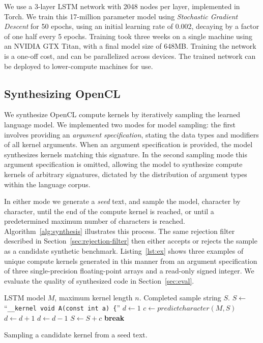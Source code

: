 We use a 3-layer LSTM network with 2048 nodes per layer, implemented in Torch. We train this 17-million parameter model using \textit{Stochastic Gradient Descent} for 50 epochs, using an initial learning rate of 0.002, decaying by a factor of one half every 5 epochs. Training took three weeks on a single machine using an NVIDIA GTX Titan, with a final model size of 648MB. Training the network is a one-off cost, and can be parallelized across devices. The trained network can be deployed to lower-compute machines for use.

\subsection{Synthesizing OpenCL}

We synthesize OpenCL compute kernels by iteratively sampling the learned language model. We implemented two modes for model sampling: the first involves providing an \emph{argument specification}, stating the data types and modifiers of all kernel arguments. When an argument specification is provided, the model synthesizes kernels matching this signature. In the second sampling mode this argument specification is omitted, allowing the model to synthesize compute kernels of arbitrary signatures, dictated by the distribution of argument types within the language corpus.

In either mode we generate a \emph{seed} text, and sample the model, character by character, until the end of the compute kernel is reached, or until a predetermined maximum number of characters is reached. Algorithm~\ref{alg:synthesis} illustrates this process. The same rejection filter described in Section~\ref{sec:rejection-filter} then either accepts or rejects the sample as a candidate synthetic benchmark. Listing~\ref{lst:ex} shows three examples of unique compute kernels generated in this manner from an argument specification of three single-precision floating-point arrays and a read-only signed integer. We evaluate the quality of synthesized code in Section~\ref{sec:eval}.

\begin{algorithm}[t]
\begin{algorithmic}[1]
\Require LSTM model $M$, maximum kernel length $n$.
\Ensure Completed sample string $S$.
\State $S \gets$``\texttt{\_\_kernel void A(const int a) \{}''
\State $d \gets 1$
  \State $c \gets predictcharacter(M, S)$
    \State $d \gets d+1$
    \State $d \gets d-1$
  \EndIf
  \State $S \gets S + c$
    \State \textbf{break}
  \EndIf

\EndFor
\end{algorithmic}
\caption{Sampling a candidate kernel from a seed text.}
\label{alg:synthesis}
\end{algorithm}


